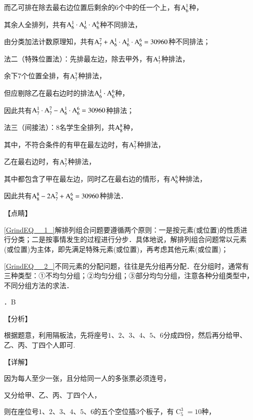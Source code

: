 \documentclass[a4paper,11pt,UTF8,twoside]{ctexart} %
\begin{document}
\noindent 而乙可排在除去最右边位置后剩余的6个中的任一个上，有${\rm A}_{6}^{1} $种，

\noindent 其余人全排列，共有${\rm A}_{6}^{1} \cdot {\rm A}_{6}^{1} \cdot {\rm A}_{6}^{6} $种不同排法，

\noindent 由分类加法计数原理知，共有${\rm A}_{7}^{7} +{\rm A}_{6}^{1} \cdot {\rm A}_{6}^{1} \cdot {\rm A}_{6}^{6} =30960$种不同排法；

\noindent 法二（特殊位置法）：先排最左边，除去甲外，有${\rm A}_{7}^{1} $种排法，

\noindent 余下7个位置全排，有${\rm A}_{7}^{7} $种排法，

\noindent 但应剔除乙在最右边时的排法${\rm A}_{6}^{1} \cdot {\rm A}_{6}^{6} $种，

\noindent 因此共有${\rm A}_{7}^{1} \cdot {\rm A}_{7}^{7} -{\rm A}_{6}^{1} \cdot {\rm A}_{6}^{6} =30960$种排法；

\noindent 法三（间接法）：8名学生全排列，共${\rm A}_{8}^{8} $种，

\noindent 其中，不符合条件的有甲在最左边时，有${\rm A}_{7}^{7} $种排法，

\noindent 乙在最右边时，有${\rm A}_{7}^{7} $种排法，

\noindent 其中都包含了甲在最左边，同时乙在最右边的情形，有${\rm A}_{6}^{6} $种排法，

\noindent 因此共有${\rm A}_{8}^{8} -2{\rm A}_{7}^{7} +{\rm A}_{6}^{6} =30960$种排法．

\noindent 【点睛】

\noindent \eqref{GrindEQ__1_}解排列组合问题要遵循两个原则：一是按元素(或位置)的性质进行分类；二是按事情发生的过程进行分步．具体地说，解排列组合问题常以元素(或位置)为主体，即先满足特殊元素(或位置)，再考虑其他元素(或位置)；

\noindent \eqref{GrindEQ__2_}不同元素的分配问题，往往是先分组再分配．在分组时，通常有三种类型：①不均匀分组；②均匀分组；③部分均匀分组，注意各种分组类型中，不同分组方法的求法．

．B

\noindent 【分析】

\noindent 根据题意，利用隔板法，先将座号$1$、$2$、$3$、$4$、$5$、$6$分成四份，然后再分给甲、乙、丙、丁四个人即可.

\noindent 【详解】

\noindent 因为每人至少一张，且分给同一人的多张票必须连号，

\noindent 又分给甲、乙、丙、丁四个人，

\noindent 则在座位号$1$、$2$、$3$、$4$、$5$、$6$的五个空位插3个板子，有$\mathop{C}\nolimits_{5}^{3} =10$种，
\end{document}
